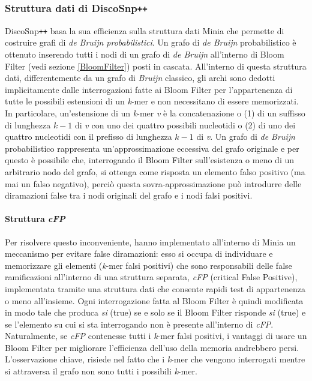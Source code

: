 \documentclass[../main.tex]{subfiles}
\begin{document}
\subsubsection{Struttura dati di DiscoSnp\texttt{++}}
\label{dBG_prob}

DiscoSnp\texttt{++} basa la sua efficienza sulla struttura dati Minia \cite{chikhi2013space} che permette di costruire grafi di \textit{de Bruijn probabilistici}. Un grafo di \textit{de Bruijn} probabilistico è ottenuto inserendo tutti i nodi di un grafo di \textit{de Bruijn} all'interno di Bloom Filter (vedi sezione \ref{BloomFilter}) posti in cascata. All'interno di questa struttura dati, differentemente da un grafo di \textit{Bruijn} classico, gli archi sono dedotti implicitamente dalle interrogazioni fatte ai Bloom Filter per l'appartenenza di tutte le possibili estensioni di un \textit{k}-mer e non necessitano di essere memorizzati. In particolare, un'estensione di un \textit{k}-mer \textit{v} è la concatenazione o (1) di un suffisso di lunghezza $k-1$ di \textit{v} con uno dei quattro possibili nucleotidi o (2) di uno dei quattro nucleotidi con il prefisso di lunghezza $k-1$ di \textit{v}. Un grafo di \textit{de Bruijn} probabilistico rappresenta un'approssimazione eccessiva del grafo originale e per questo è possibile che, interrogando il Bloom Filter sull'esistenza o meno di un arbitrario nodo del grafo, si ottenga come risposta un elemento falso positivo (ma mai un falso negativo), perciò questa sovra-approssimazione può introdurre delle diramazioni false tra i nodi originali del grafo e i nodi falsi positivi.

\paragraph{Struttura \textit{cFP}} Per risolvere questo inconveniente, \cite{chikhi2013space} hanno implementato all'interno di Minia un meccanismo per evitare false diramazioni: esso si occupa di individuare e memorizzare gli elementi (\textit{k}-mer falsi positivi) che sono responsabili delle false ramificazioni all'interno di una struttura separata, \textit{cFP} (critical False Positive), implementata tramite una struttura dati che consente rapidi test di appartenenza o meno all'insieme. Ogni interrogazione fatta al Bloom Filter è quindi modificata in modo tale che produca \textit{si} (true) se e solo se il Bloom Filter risponde \textit{si} (true) e se l'elemento su cui si sta interrogando non è presente all'interno di \textit{cFP}. Naturalmente, se \textit{cFP} contenesse tutti i \textit{k}-mer falsi positivi, i vantaggi di usare un Bloom Filter per migliorare l'efficienza dell'uso della memoria andrebbero persi. L'osservazione chiave, risiede nel fatto che i \textit{k}-mer che vengono interrogati mentre si attraversa il grafo non sono tutti i possibili \textit{k}-mer. 
\end{document}
